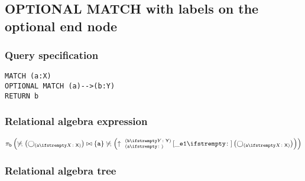
\subsection{OPTIONAL MATCH with labels on the optional end node}

\subsubsection*{Query specification}

\begin{lstlisting}
MATCH (a:X)
OPTIONAL MATCH (a)-->(b:Y)
RETURN b
\end{lstlisting}

\subsubsection*{Relational algebra expression}

$\projection{\var{b}} \left(\alldifferent{} \left(\getvertices{a}{X}\right) \join \{\var{a}\} \alldifferent{} \left(\expandout{a}{b}{Y}{\_e1}{} \left(\getvertices{a}{X}\right)\right)\right)$

\subsubsection*{Relational algebra tree}


